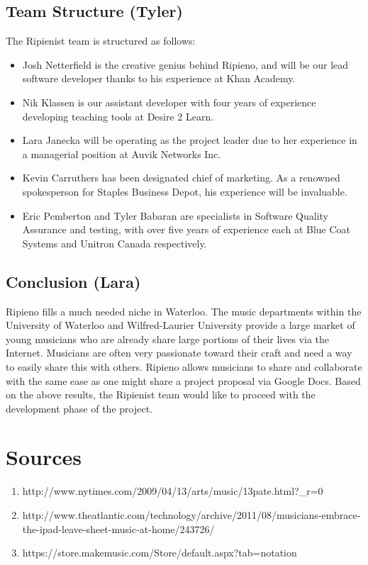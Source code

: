 \documentclass[12pt]{article}
\begin{document}
\subsection{Team Structure (Tyler)}
The Ripienist team is structured as follows:
\begin{itemize}
\item Josh Netterfield is the creative genius behind Ripieno, and will be our lead software developer thanks to his experience at Khan Academy.
\item Nik Klassen is our assistant developer with four years of experience developing teaching tools at Desire 2 Learn.
\item Lara Janecka will be operating as the project leader due to her experience in a managerial position at Auvik Networks Inc.
\item Kevin Carruthers has been designated chief of marketing. As a renowned spokesperson for Staples Business Depot, his experience will be invaluable.
\item Eric Pemberton and Tyler Babaran are specialists in Software Quality Assurance and testing, with over five years of experience each at Blue Coat Systems and Unitron Canada respectively.
\end{itemize}

\subsection{Conclusion (Lara)}
Ripieno fills a much needed niche in Waterloo. The music departments within the University of Waterloo and Wilfred-Laurier University provide a large market of young musicians who are already share large portions of their lives via the Internet. Musicians are often very passionate toward their craft and need a way to easily share this with others. Ripieno allows musicians to share and collaborate with the same ease as one might share a project proposal via Google Docs. Based on the above results, the Ripienist team would like to proceed with the development phase of the project.
\newpage

\section{Sources}
\begin{enumerate}
\item http://www.nytimes.com/2009/04/13/arts/music/13pate.html?\_r=0
\item http://www.theatlantic.com/technology/archive/2011/08/musicians-embrace-the-ipad-leave-sheet-music-at-home/243726/
\item https://store.makemusic.com/Store/default.aspx?tab=notation
\end{enumerate}
\end{document}
